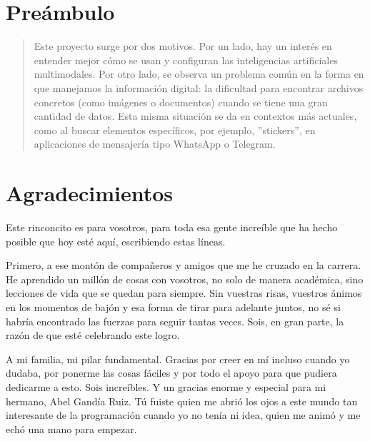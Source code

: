 
\chapter*{Preámbulo}
\thispagestyle{empty}
\begin{quote}
Este proyecto surge por dos motivos. Por un lado, hay un interés en entender mejor cómo se usan y configuran las inteligencias artificiales multimodales. Por otro lado, se observa un problema común en la forma en que manejamos la información digital: la dificultad para encontrar archivos concretos (como imágenes o documentos) cuando se tiene una gran cantidad de datos. Esta misma situación se da en contextos más actuales, como al buscar elementos específicos, por ejemplo, ”stickers”, en aplicaciones de mensajería tipo WhatsApp o Telegram.
\end{quote}


\cleardoublepage %
\chapter*{Agradecimientos}
\thispagestyle{empty}
Este rinconcito es para vosotros, para toda esa gente increíble que ha hecho posible que hoy esté aquí, escribiendo estas líneas.

Primero, a ese montón de compañeros y amigos que me he cruzado en la carrera. He aprendido un millón de cosas con vosotros, no solo de manera académica, sino lecciones de vida que se quedan para siempre. Sin vuestras risas, vuestros ánimos en los momentos de bajón y esa forma de tirar para adelante juntos, no sé si habría encontrado las fuerzas para seguir tantas veces. Sois, en gran parte, la razón de que esté celebrando este logro.

A mi familia, mi pilar fundamental. Gracias por creer en mí incluso cuando yo dudaba, por ponerme las cosas fáciles y por todo el apoyo para que pudiera dedicarme a esto. Sois increíbles. Y un gracias enorme y especial para mi hermano, Abel Gandía Ruiz. Tú fuiste quien me abrió los ojos a este mundo tan interesante de la programación cuando yo no tenía ni idea, quien me animó y me echó una mano para empezar.

